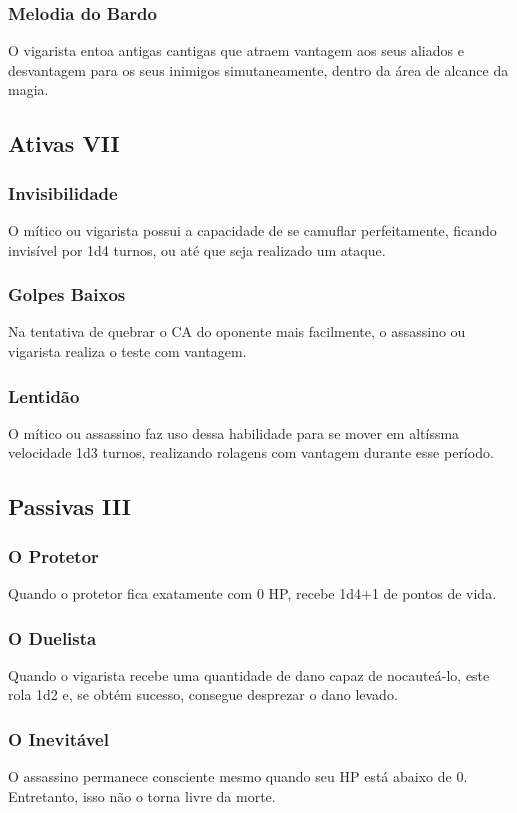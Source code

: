 \documentclass[10pt,twoside,twocolumn]{book}
\begin{document}
\subsubsection*{Melodia do Bardo}
O vigarista entoa antigas cantigas que atraem vantagem aos seus aliados e desvantagem para os seus inimigos simutaneamente, dentro da área de alcance da magia.

\subsection*{Ativas VII}
\subsubsection*{Invisibilidade}
O mítico ou vigarista possui a capacidade de se camuflar perfeitamente, ficando invisível por 1d4 turnos, ou até que seja realizado um ataque.
\subsubsection*{Golpes Baixos}
Na tentativa de quebrar o CA do oponente mais facilmente, o assassino ou vigarista realiza o teste com vantagem.
\subsubsection*{Lentidão}
O mítico ou assassino faz uso dessa habilidade para se mover em altíssma velocidade 1d3 turnos, realizando rolagens com vantagem durante esse período.

\subsection*{Passivas III}
\subsubsection*{O Protetor}
Quando o protetor fica exatamente com 0 HP, recebe 1d4+1 de pontos de vida.
\subsubsection*{O Duelista}
Quando o vigarista recebe uma quantidade de dano capaz de nocauteá-lo, este rola 1d2 e, se obtém sucesso, consegue desprezar o dano levado.
\subsubsection*{O Inevitável}
O assassino permanece consciente mesmo quando seu HP está abaixo de 0. Entretanto, isso não o torna livre da morte.
\end{document}
